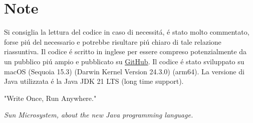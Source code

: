 \chapter*{Note}

Si consiglia la lettura del codice in caso di necessit\'a, \'e stato molto commentato, forse pi\'u del necessario e potrebbe risultare pi\'u chiaro di tale relazione riassuntiva. Il codice \'e scritto in inglese per essere compreso potenzialmente da un pubblico pi\'u ampio e pubblicato su {\color{cyan}\href{https://github.com/JuliusNixi/CROSS}{GitHub}}. Il codice \'e stato sviluppato su macOS (Sequoia 15.3) (Darwin Kernel Version 24.3.0) (arm64). La versione di Java utilizzata \'e la Java JDK 21 LTS (long time support).

\vspace{5mm}

\epigraph{"Write Once, Run Anywhere."}{\textit{Sun Microsystem, about the new Java programming language. }}

